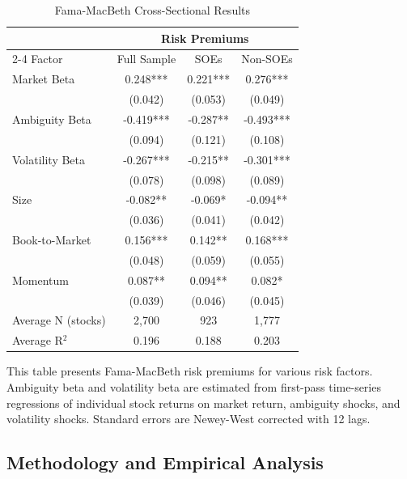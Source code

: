 \documentclass[preprint,12pt,authoryear]{elsarticle}
\begin{document}
\begin{table}[htbp]
\centering
\caption{Fama-MacBeth Cross-Sectional Results}
\label{tab:fama_macbeth}
\begin{threeparttable}
\begin{tabular*}{\textwidth}{@{\extracolsep{\fill}} lccc @{\extracolsep{\fill}}}
\toprule
& \multicolumn{3}{c}{Risk Premiums} \\
\cmidrule(lr){2-4}
Factor & Full Sample & SOEs & Non-SOEs \\
\midrule
\midrule
Market Beta & 0.248*** & 0.221*** & 0.276*** \\
& (0.042) & (0.053) & (0.049) \\
Ambiguity Beta & -0.419*** & -0.287** & -0.493*** \\
& (0.094) & (0.121) & (0.108) \\
Volatility Beta & -0.267*** & -0.215** & -0.301*** \\
& (0.078) & (0.098) & (0.089) \\
Size & -0.082** & -0.069* & -0.094** \\
& (0.036) & (0.041) & (0.042) \\
Book-to-Market & 0.156*** & 0.142** & 0.168*** \\
& (0.048) & (0.059) & (0.055) \\
Momentum & 0.087** & 0.094** & 0.082* \\
& (0.039) & (0.046) & (0.045) \\
\midrule
Average N (stocks) & 2,700 & 923 & 1,777 \\
Average R$^2$ & 0.196 & 0.188 & 0.203 \\
\bottomrule
\end{tabular*}
\begin{tablenotes}[flushleft]
\small
\item[] This table presents Fama-MacBeth risk premiums for various risk factors. Ambiguity beta and volatility beta are estimated from first-pass time-series regressions of individual stock returns on market return, ambiguity shocks, and volatility shocks. Standard errors are Newey-West corrected with 12 lags.
\end{tablenotes}
\end{threeparttable}
\end{table}

\subsection{Methodology and Empirical Analysis}
\end{document}
